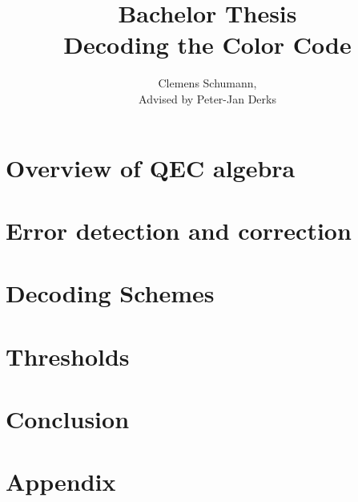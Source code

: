 \documentclass[12pt]{article}
\title{Bachelor Thesis\\ Decoding the Color Code}
\author{Clemens Schumann, \\
Advised by Peter-Jan Derks}
\begin{document}
\maketitle
\newpage
\tableofcontents
\newpage
%
\section{Overview of QEC algebra}

\newpage
\section{Error detection and correction}

\newpage
\section{Decoding Schemes}

\section{Thresholds}

\section{Conclusion}

\newpage
\section{Appendix}



\newpage


\end{document}
